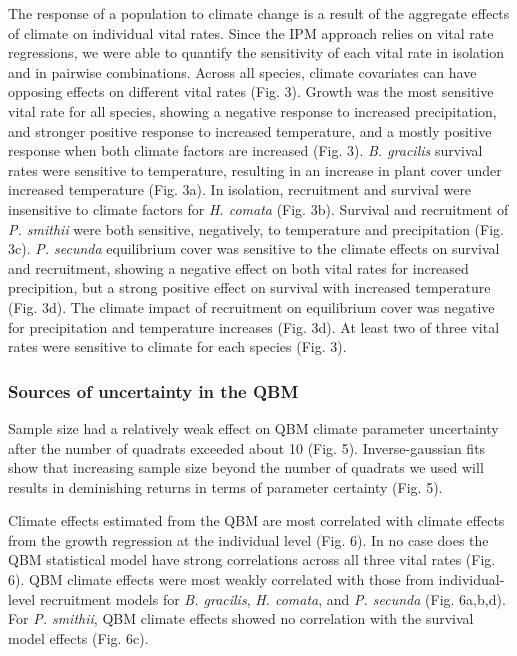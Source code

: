 \documentclass[12pt,]{article}
\begin{document}
The response of a population to climate change is a result of the
aggregate effects of climate on individual vital rates. Since the IPM
approach relies on vital rate regressions, we were able to quantify the
sensitivity of each vital rate in isolation and in pairwise
combinations. Across all species, climate covariates can have opposing
effects on different vital rates (Fig. 3). Growth was the most sensitive
vital rate for all species, showing a negative response to increased
precipitation, and stronger positive response to increased temperature,
and a mostly positive response when both climate factors are increased
(Fig. 3). \emph{B. gracilis} survival rates were sensitive to
temperature, resulting in an increase in plant cover under increased
temperature (Fig. 3a). In isolation, recruitment and survival were
insensitive to climate factors for \emph{H. comata} (Fig. 3b). Survival
and recruitment of \emph{P. smithii} were both sensitive, negatively, to
temperature and precipitation (Fig. 3c). \emph{P. secunda} equilibrium
cover was sensitive to the climate effects on survival and recruitment,
showing a negative effect on both vital rates for increased precipition,
but a strong positive effect on survival with increased temperature
(Fig. 3d). The climate impact of recruitment on equilibrium cover was
negative for precipitation and temperature increases (Fig. 3d). At least
two of three vital rates were sensitive to climate for each species
(Fig. 3).

\subsubsection{Sources of uncertainty in the
QBM}\label{sources-of-uncertainty-in-the-qbm}

Sample size had a relatively weak effect on QBM climate parameter
uncertainty after the number of quadrats exceeded about 10 (Fig. 5).
Inverse-gaussian fits show that increasing sample size beyond the number
of quadrats we used will results in deminishing returns in terms of
parameter certainty (Fig. 5).

Climate effects estimated from the QBM are most correlated with climate
effects from the growth regression at the individual level (Fig. 6). In
no case does the QBM statistical model have strong correlations across
all three vital rates (Fig. 6). QBM climate effects were most weakly
correlated with those from individual-level recruitment models for
\emph{B. gracilis}, \emph{H. comata}, and \emph{P. secunda} (Fig.
6a,b,d). For \emph{P. smithii}, QBM climate effects showed no
correlation with the survival model effects (Fig. 6c).
\end{document}
